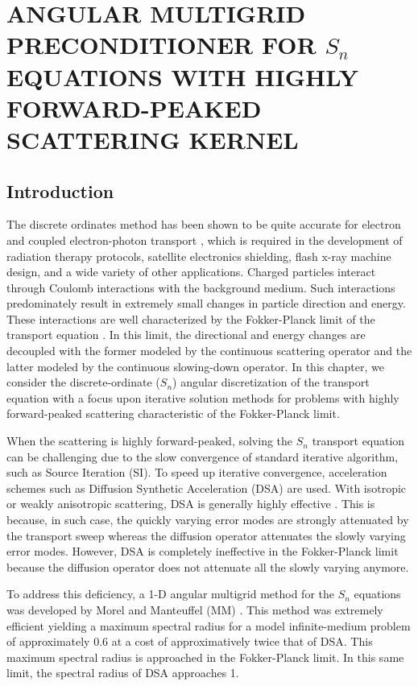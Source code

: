 \chapter{\uppercase{Angular Multigrid Preconditioner for $S_n$ equations with Highly
Forward-Peaked Scattering Kernel}} \label{anmg_chapter}
\section{Introduction}
The discrete ordinates method has been shown to be quite accurate for electron
and coupled electron-photon transport \cite{accuracy_2,morel_81,accuracy_1}, 
which is required in the development of radiation therapy protocols, satellite 
electronics shielding, flash x-ray machine design, and a wide variety of other 
applications. Charged particles interact through Coulomb interactions with the 
background medium. Such interactions predominately result in extremely small changes 
in particle direction and energy. These interactions are well characterized by the
Fokker-Planck limit of the transport equation \cite{fp_limit,morel_96}. In this 
limit, the directional and energy changes are decoupled with the former modeled 
by the continuous scattering operator and the latter modeled by the continuous 
slowing-down operator. In this chapter, we consider the discrete-ordinate ($S_n$) 
angular discretization of the transport equation with a focus upon iterative 
solution methods for problems with highly forward-peaked scattering characteristic 
of the Fokker-Planck limit. 

When the scattering is highly forward-peaked, solving the $S_n$ transport
equation can be challenging due to the slow convergence of standard iterative
algorithm, such as Source Iteration (SI). To speed up iterative convergence,
acceleration schemes such as Diffusion Synthetic Acceleration (DSA) are used.
With isotropic or weakly anisotropic scattering, DSA is generally highly
effective \cite{dsa_ref}. This is because, in such case, the quickly varying
error modes are strongly attenuated by the transport sweep whereas the
diffusion operator attenuates the slowly varying error modes. However, DSA is
completely ineffective in the Fokker-Planck limit \cite{multigrid_1d} because
the diffusion operator does not attenuate all the slowly varying anymore.

To address this deficiency, a 1-D angular multigrid method for the $S_n$
equations was developed by Morel and Manteuffel (MM) \cite{multigrid_1d}. This
method was extremely efficient yielding a maximum spectral radius for 
a model infinite-medium problem of approximately 0.6 at a cost of
approximatively twice that of DSA. This maximum spectral radius is approached
in the Fokker-Planck limit. In this same limit, the spectral radius of DSA
approaches 1. 

